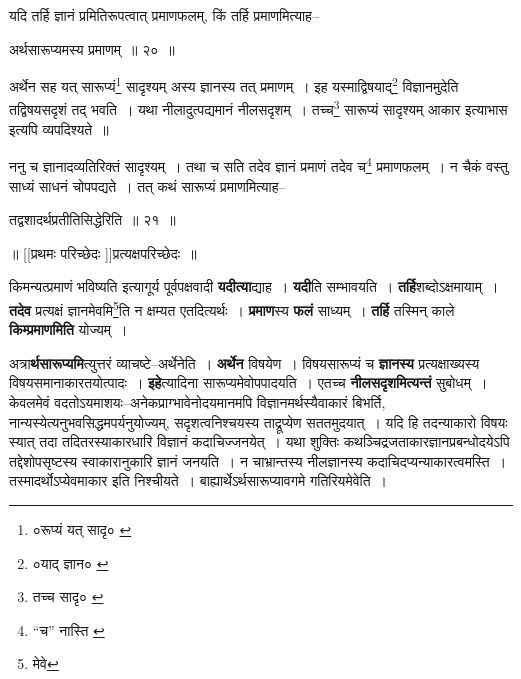 \documentclass[article,12pt,a4paper]{memoir}
\begin{document}
	  \pstart यदि तर्हि ज्ञानं प्रमितिरूपत्वात् प्रमाणफलम्, किं तर्हि प्रमाणमित्याह--
	\pend
       
	  \bigskip
	  \begingroup
	

	  \pstart अर्थसारूप्यमस्य प्रमाणम् ॥ २० ॥
	\pend
      
	  \endgroup
	 

	  \pstart अर्थेन सह यत् सारूप्यं\footnote{०रूप्यं यत् सादृ० \cite{dp-msB} \cite{dp-msD}} सादृश्यम् अस्य ज्ञानस्य तत् प्रमाणम् । इह यस्माद्विषयाद्\footnote{०याद् ज्ञान० \cite{dp-msA} \cite{dp-msC} \cite{dp-edP} \cite{dp-edH} \cite{dp-edE} \cite{dp-edN}} विज्ञानमुदेति तद्विषयसदृशं तद् भवति । यथा नीलादुत्पद्यमानं नीलसदृशम् । तच्च\footnote{तच्च सादृ० \cite{dp-msA} \cite{dp-edP} \cite{dp-edE}} सारूप्यं सादृश्यम् आकार इत्याभास इत्यपि व्यपदिश्यते ॥
	\pend
       

	  \pstart ननु च ज्ञानादव्यतिरिक्तं सादृश्यम् । तथा च सति तदेव ज्ञानं प्रमाणं तदेव च\footnote{“च” नास्ति \cite{dp-msA} \cite{dp-msB} \cite{dp-msC} \cite{dp-edP} \cite{dp-edH} \cite{dp-edE} \cite{dp-edN}} प्रमाणफलम् । न चैकं वस्तु साध्यं साधनं चोपपद्यते । तत् कथं सारूप्यं प्रमाणमित्याह--
	\pend
       
	  \bigskip
	  \begingroup
	

	  \pstart तद्वशादर्थप्रतीतिसिद्धेरिति ॥ २१ ॥
	\pend
       
	    
	    \pstart
	    \begin{center}
	  ॥ [[प्रथमः परिच्छेदः \cite{dp-msB} \cite{dp-msC}]]प्रत्यक्षपरिच्छेदः ॥
	    \end{center}
	    \pend
	  
	  
	  \endgroup
	
	  \endgroup
	

	  \pstart किमन्यत्प्रमाणं भविष्यति इत्यागूर्य पूर्वपक्षवादी \textbf{यदीत्या}द्याह । \textbf{यदी}ति सम्भावयति । \textbf{तर्हि}शब्दोऽक्षमायाम् । \textbf{तदेव} प्रत्यक्षं ज्ञानमेवमि\footnote{मेवे}\-ति न क्षम्यत एतदित्यर्थः । \textbf{प्रमाण}स्य \textbf{फलं} साध्यम् । \textbf{तर्हि} तस्मिन् काले \textbf{किम्प्रमाणमिति} योज्यम् ।
	\pend
      

	  \pstart अत्रा\textbf{र्थसारूप्यमि}त्युत्तरं व्याचष्टे--अ\leavevmode{}र्थेनेति । \textbf{अर्थेन} विषयेण । विषयसारूप्यं च \textbf{ज्ञानस्य} प्रत्यक्षाख्यस्य विषयसमानाकारतयोत्पादः । \textbf{इहे}त्यादिना सारूप्यमेवोपपादयति । एतच्च \textbf{नीलसदृशमित्यन्तं} सुबोधम् । केवलमेवं वदतोऽयमाशयः--अनेकप्राग्भावेनोदयमानमपि विज्ञानमर्थस्यैवाकारं बिभर्ति, नान्यस्येत्यनुभवसिद्धमपर्यनुयोज्यम्, सदृशत्वनिश्चयस्य ताद्रूप्येण सततमुदयात् । यदि हि तदन्याकारो विषयः स्यात् तदा तदितरस्याकारधारि विज्ञानं कदाचिज्जनयेत् । यथा शुक्तिः कथञ्चिद्रजताकारज्ञानप्रबन्धोदयेऽपि तद्देशोपसृष्टस्य स्वाकारानुकारि ज्ञानं जनयति । न चाभ्रान्तस्य नीलज्ञानस्य कदाचिदप्यन्याकारत्वमस्ति । तस्मादर्थोऽप्येवमाकार इति निश्चीयते । बाह्यार्थेऽर्थसारूप्यावगमे गतिरियमेवेति ।
	\pend
      
\end{document}
